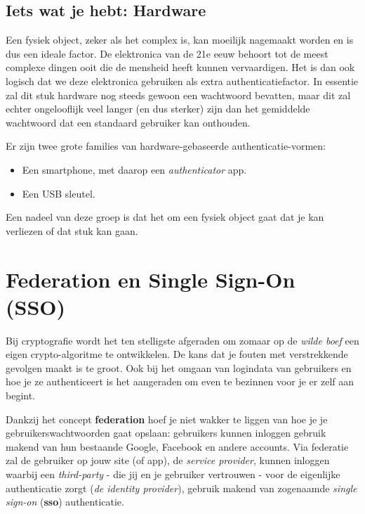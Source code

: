 \documentclass[
  10pt,
  dutch,
  paper=a4,
  ,captions=tableheading
]{scrbook}
\providecommand{\tightlist}{%
  \setlength{\itemsep}{0pt}\setlength{\parskip}{0pt}}
\begin{document}
\subsection{Iets wat je hebt: Hardware}\label{iets-wat-je-hebt-hardware}

Een fysiek object, zeker als het complex is, kan moeilijk nagemaakt
worden en is dus een ideale factor. De elektronica van de 21e eeuw
behoort tot de meest complexe dingen ooit die de mensheid heeft kunnen
vervaardigen. Het is dan ook logisch dat we deze elektronica gebruiken
als extra authenticatiefactor. In essentie zal dit stuk hardware nog
steeds gewoon een wachtwoord bevatten, maar dit zal echter ongelooflijk
veel langer (en dus sterker) zijn dan het gemiddelde wachtwoord dat een
standaard gebruiker kan onthouden.

Er zijn twee grote families van hardware-gebaseerde
authenticatie-vormen:

\begin{itemize}
\tightlist
\item
  Een smartphone, met daarop een \emph{authenticator} app.
\item
  Een USB sleutel.
\end{itemize}

Een nadeel van deze groep is dat het om een fysiek object gaat dat je
kan verliezen of dat stuk kan gaan.

\section{Federation en Single Sign-On
(SSO)}\label{federation-en-single-sign-on-sso}

Bij cryptografie wordt het ten stelligste afgeraden om zomaar op de
\emph{wilde boef} een eigen crypto-algoritme te ontwikkelen. De kans dat
je fouten met verstrekkende gevolgen maakt is te groot. Ook bij het
omgaan van logindata van gebruikers en hoe je ze authenticeert is het
aangeraden om even te bezinnen voor je er zelf aan begint.

Dankzij het concept \textbf{federation} hoef je niet wakker te liggen
van hoe je je gebruikerswachtwoorden gaat opslaan: gebruikers kunnen
inloggen gebruik makend van hun bestaande Google, Facebook en andere
accounts. Via federatie zal de gebruiker op jouw site (of app), de
\emph{service provider}, kunnen inloggen waarbij een \emph{third-party}
- die jij en je gebruiker vertrouwen - voor de eigenlijke authenticatie
zorgt (\emph{de identity provider}), gebruik makend van zogenaamde
\emph{single sign-on} (\textbf{sso}) authenticatie.
\end{document}
